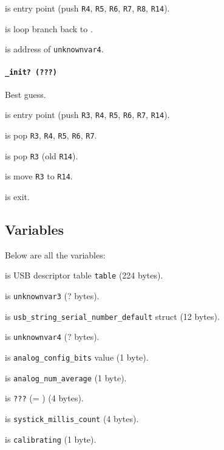  is entry point (push \texttt{R4}, \texttt{R5},
\texttt{R6}, \texttt{R7}, \texttt{R8}, \texttt{R14}).

 is loop branch back to .

 is address of \texttt{unknownvar4}.

\paragraph{\texttt{\_init? (???)}} Best guess.

 is entry point (push \texttt{R3}, \texttt{R4},
\texttt{R5}, \texttt{R6}, \texttt{R7}, \texttt{R14}).

 is pop \texttt{R3}, \texttt{R4}, \texttt{R5},
\texttt{R6}, \texttt{R7}.

 is pop \texttt{R3} (old \texttt{R14}).

 is move \texttt{R3} to \texttt{R14}.

 is exit.

\subsection{Variables}

Below are all the variables:

\vspace{1em}

 is USB descriptor table \texttt{table} (224 bytes).

 is \texttt{unknownvar3} (? bytes).

 is {\tiny
\texttt{usb\_string\_serial\_number\_default}} struct (12 bytes).

 is \texttt{unknownvar4} (? bytes).

 is \texttt{analog\_config\_bits} value (1 byte).

 is \texttt{analog\_num\_average} (1 byte).

 is \texttt{???} (= ) (4 bytes).

 is \texttt{systick\_millis\_count} (4 bytes).

 is \texttt{calibrating} (1 byte).

